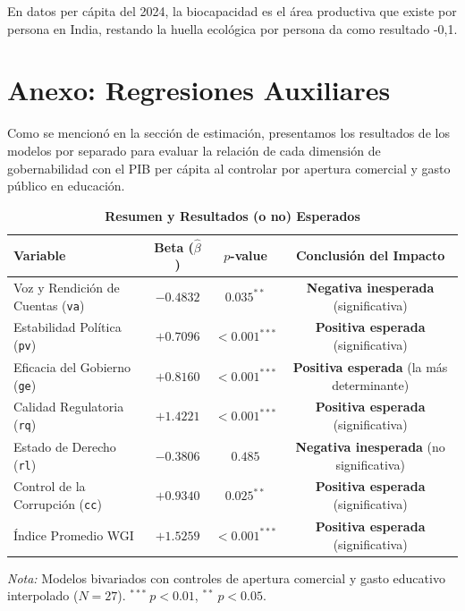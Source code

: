 \documentclass[11pt, a4paper]{article}
\begin{document}
En datos per cápita del 2024, la biocapacidad es el área productiva que existe por persona en India, restando la huella ecológica por persona da como resultado -0,1.

\newpage
\appendix
\section{Anexo: Regresiones Auxiliares}

Como se mencionó en la sección de estimación, presentamos los resultados de los modelos por separado para evaluar la relación de cada dimensión de gobernabilidad con el PIB per cápita al controlar por apertura comercial y gasto público en educación.

\begin{table}[H]
\centering
\small
\caption{\textbf{Resumen y Resultados (o no) Esperados}}
\label{tab:anexo_sintesis}
\begin{tabular*}{\textwidth}{l @{\extracolsep{\fill}} ccc}
\toprule
\textbf{Variable} & \textbf{Beta ($\hat{\beta}$)} & \textbf{$p$-value} & \textbf{Conclusión del Impacto} \\
\midrule
Voz y Rendición de Cuentas (\texttt{va}) & $-0.4832$ & $0.035^{**}$  & \textbf{Negativa inesperada} (significativa) \\
Estabilidad Política (\texttt{pv})       & $+0.7096$ & $<0.001^{***}$ & \textbf{Positiva esperada} (significativa) \\
Eficacia del Gobierno (\texttt{ge})      & $+0.8160$ & $<0.001^{***}$ & \textbf{Positiva esperada} (la más determinante) \\
Calidad Regulatoria (\texttt{rq})        & $+1.4221$ & $<0.001^{***}$ & \textbf{Positiva esperada} (significativa) \\
Estado de Derecho (\texttt{rl})          & $-0.3806$ & $0.485$        & \textbf{Negativa inesperada} (no significativa) \\
Control de la Corrupción (\texttt{cc})   & $+0.9340$ & $0.025^{**}$   & \textbf{Positiva esperada} (significativa) \\
\midrule
Índice Promedio WGI                      & $+1.5259$ & $<0.001^{***}$ & \textbf{Positiva esperada} (significativa) \\
\bottomrule
\end{tabular*}
\begin{minipage}{\textwidth}
\vspace{0.3em}
\scriptsize \textit{Nota:} Modelos bivariados con controles de apertura comercial y gasto educativo interpolado ($N = 27$). $^{***}\ p<0.01$, $^{**}\ p<0.05$.
\end{minipage}
\end{table}
\end{document}
